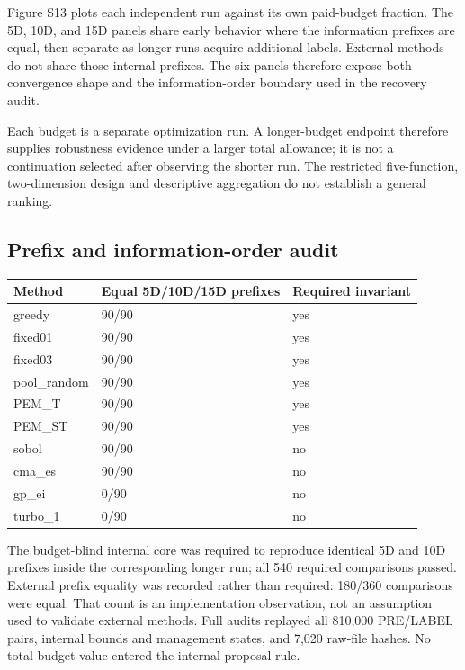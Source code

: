 \documentclass[cmc,article,submit,moreauthors,pdftex]{Definitions/tsp}
\begin{document}
Figure S13 plots each independent run against its own paid-budget fraction. The 5D, 10D, and 15D panels share early behavior where the information prefixes are equal, then separate as longer runs acquire additional labels. External methods do not share those internal prefixes. The six panels therefore expose both convergence shape and the information-order boundary used in the recovery audit.

Each budget is a separate optimization run. A longer-budget endpoint therefore supplies robustness evidence under a larger total allowance; it is not a continuation selected after observing the shorter run. The restricted five-function, two-dimension design and descriptive aggregation do not establish a general ranking.

\hypertarget{prefix-and-information-order-audit}{%
\subsection{Prefix and information-order audit}\label{prefix-and-information-order-audit}}

\begin{longtable}[]{@{}lll@{}}
\toprule
Method & Equal 5D/10D/15D prefixes & Required invariant \\
\midrule
\endhead
greedy & 90/90 & yes \\
fixed01 & 90/90 & yes \\
fixed03 & 90/90 & yes \\
pool\_random & 90/90 & yes \\
PEM\_T & 90/90 & yes \\
PEM\_ST & 90/90 & yes \\
sobol & 90/90 & no \\
cma\_es & 90/90 & no \\
gp\_ei & 0/90 & no \\
turbo\_1 & 0/90 & no \\
\bottomrule
\end{longtable}

The budget-blind internal core was required to reproduce identical 5D and 10D prefixes inside the corresponding longer run; all 540 required comparisons passed. External prefix equality was recorded rather than required: 180/360 comparisons were equal. That count is an implementation observation, not an assumption used to validate external methods. Full audits replayed all 810,000 PRE/LABEL pairs, internal bounds and management states, and 7,020 raw-file hashes. No total-budget value entered the internal proposal rule.
\end{document}
